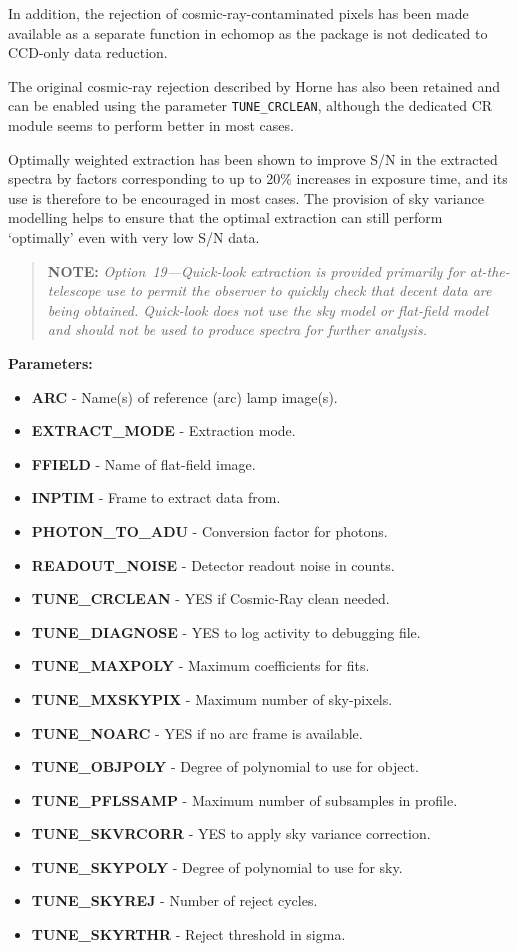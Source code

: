 \documentclass[11pt,twoside]{article}
\makeatletter
\newcommand{\htmlref}[2]{#1}
\newcommand{\myindex}[1]{\index{#1}}
\newcommand{\indexcmdname}[1]{\index{#1@\protect\cmdname{#1}}}
\renewcommand{\myindex}[1]{}
\renewcommand{\indexcmdname}[1]{}
\newcommand{\cmdname}{\begingroup \catcode`\_=12 \realcmdname}
\newcommand{\realcmdname}[1]{\endgroup\texttt{#1}}
\newcommand{\echpars}[1]{
{\bf Parameters:\vspace*{6pt}\\}
    #1
}
\renewcommand{\echpars}[1]{
{\bf Parameters:}
\begin{itemize}
#1
\end{itemize}
}
\newcommand{\epar}[3]
{
    \hspace*{5mm}\makebox[50mm][l]{\bf #1} #2 (p~\pageref{par_#3}.)\\
}
\renewcommand{\epar}[3]
{\item \htmlref{{\bf #1}}{par_#3} - #2}
\newcommand{\lepar}[3]
{
    \hspace*{5mm}\makebox[50mm][l]{\bf #1} #2 (p~\pageref{par_#3}.)
}
\renewcommand{\lepar}[3]
{\item \htmlref{{\bf #1}}{par_#3} - #2}
\makeatother
\begin{document}
In addition, the rejection of cosmic-ray-contaminated pixels has been made
available as a separate function in {\sc echomop} as the package is not dedicated
to CCD-only data reduction.
\myindex{Cosmic rays!using Horne algorithm}
\indexcmdname{TUNE_CRCLEAN}
The original cosmic-ray rejection described by Horne has also been retained
and can be enabled using the parameter
\htmlref{{\tt TUNE\_CRCLEAN}}{par_TUNE_CRCLEAN}, although
the dedicated CR module seems to perform better in most cases.
\myindex{Signal-to-noise, optimal extraction}
Optimally weighted extraction has been shown to improve S/N in the
extracted spectra by factors corresponding to up to 20\% increases in
exposure time, and its use is therefore to be encouraged in most cases. The
provision of sky variance modelling helps to ensure that the optimal
extraction can still perform `optimally' even with very low S/N data.
\myindex{Quick-look extraction}
\myindex{Extraction!quick-look}

\begin{quote}

  {\bf NOTE:} {\sl Option~19---Quick-look extraction is provided
  primarily for at-the-telescope use to permit the observer to quickly
  check that decent data are being obtained. Quick-look does not use the
  sky model or flat-field model and should not be used to produce
  spectra for further analysis.}

\end{quote}

\echpars{
\epar{ARC}{Name(s) of reference (arc) lamp image(s).}{ARC}
\epar{EXTRACT\_MODE}{Extraction mode.}{EXTRACT_MODE}
\epar{FFIELD}{Name of flat-field image.}{FFIELD}
\epar{INPTIM}{Frame to extract data from.}{INPTIM}
\epar{PHOTON\_TO\_ADU}{Conversion factor for photons.}{PHOTON_TO_ADU}
\epar{READOUT\_NOISE}{Detector readout noise in counts.}{READOUT_NOISE}
\epar{TUNE\_CRCLEAN}{YES if Cosmic-Ray clean needed.}{TUNE_CRCLEAN}
\epar{TUNE\_DIAGNOSE}{YES to log activity to debugging file.}{TUNE_DIAGNOSE}
\epar{TUNE\_MAXPOLY}{Maximum coefficients for fits.}{TUNE_MAXPOLY}
\epar{TUNE\_MXSKYPIX}{Maximum number of sky-pixels.}{TUNE_MXSKYPIX}
\epar{TUNE\_NOARC}{YES if no arc frame is available.}{TUNE_NOARC}
\epar{TUNE\_OBJPOLY}{Degree of polynomial to use for object.}{TUNE_OBJPOLY}
\epar{TUNE\_PFLSSAMP}{Maximum number of subsamples in profile.}{TUNE_PFLSSAMP}
\epar{TUNE\_SKVRCORR}{YES to apply sky variance correction.}{TUNE_SKVRCORR}
\epar{TUNE\_SKYPOLY}{Degree of polynomial to use for sky.}{TUNE_SKYPOLY}
\epar{TUNE\_SKYREJ}{Number of reject cycles.}{TUNE_SKYREJ}
\lepar{TUNE\_SKYRTHR}{Reject threshold in sigma.}{TUNE_SKYRTHR}
}
\end{document}
